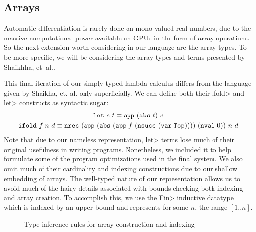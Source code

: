 \subsection{Arrays}\label{sec:arrays}
  Automatic differentiation is rarely done on mono-valued real numbers, due to the massive computational power available on GPUs in the form of array operations.
  So the next extension worth considering in our language are the array types.
  To be more specific, we will be considering the array types and terms presented by Shaikhha, et. al.\cite{Shaikha2019}.

  This final iteration of our simply-typed lambda calculus differs from the \Fsmooth{} language given by Shaikha, et. al. only superficially.
  We can define both their \<ifold> and \<let> constructs as syntactic sugar:
  \begin{gather*}
    \texttt{let}\ e\ t \equiv \texttt{app}\ (\texttt{abs}\ t)\ e \\
    \texttt{ifold}\ f\ n\ d \equiv
    \texttt{nrec}\ (\texttt{app}\ (\texttt{abs}\ (\texttt{app}\ f\ (\texttt{nsucc}\ (\texttt{var}\ \texttt{Top}))))\ (\texttt{nval}\ 0))\ n\ d
  \end{gather*}
  Note that due to our nameless representation, \<let> terms lose much of their original usefulness in writing programs.
  Nonetheless, we included it to help formulate some of the program optimizations used in the final system.
  We also omit much of their cardinality and indexing constructions due to our shallow embedding of arrays.
  The well-typed nature of our representation allows us to avoid much of the hairy details associated with bounds checking both indexing and array creation.
  To accomplish this, we use the \<Fin> inductive datatype which is indexed by an upper-bound and represents for some $n$, the range $[1..n]$.

  \begin{figure}
    \caption{Type-inference rules for array construction and indexing}
    \label{fig:array_infer}
  \end{figure}

